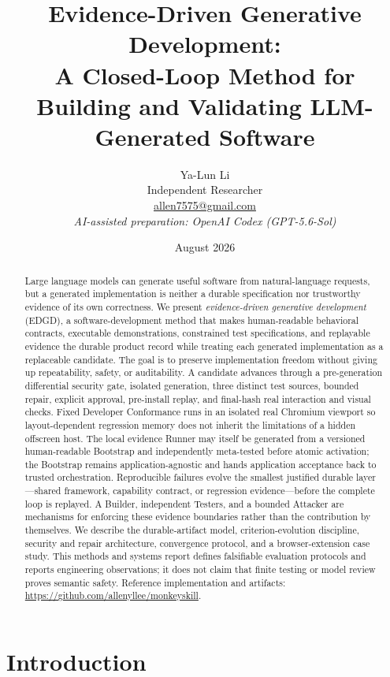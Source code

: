 \documentclass[10pt]{article}
\title{Evidence-Driven Generative Development:\\
A Closed-Loop Method for Building and Validating LLM-Generated Software}
\author{Ya-Lun Li\\
Independent Researcher\\
\href{mailto:allen7575@gmail.com}{allen7575@gmail.com}\\[0.6em]
\small\textit{AI-assisted preparation: OpenAI Codex (GPT-5.6-Sol)}}
\date{August 2026}
\newcommand{\method}{\textsc{EDGD}\xspace}
\begin{document}
\maketitle

\begin{abstract}
Large language models can generate useful software from natural-language requests, but a generated implementation is neither a durable specification nor trustworthy evidence of its own correctness. We present \emph{evidence-driven generative development} (\method), a software-development method that makes human-readable behavioral contracts, executable demonstrations, constrained test specifications, and replayable evidence the durable product record while treating each generated implementation as a replaceable candidate. The goal is to preserve implementation freedom without giving up repeatability, safety, or auditability. A candidate advances through a pre-generation differential security gate, isolated generation, three distinct test sources, bounded repair, explicit approval, pre-install replay, and final-hash real interaction and visual checks. Fixed Developer Conformance runs in an isolated real Chromium viewport so layout-dependent regression memory does not inherit the limitations of a hidden offscreen host. The local evidence Runner may itself be generated from a versioned human-readable Bootstrap and independently meta-tested before atomic activation; the Bootstrap remains application-agnostic and hands application acceptance back to trusted orchestration. Reproducible failures evolve the smallest justified durable layer---shared framework, capability contract, or regression evidence---before the complete loop is replayed. A Builder, independent Testers, and a bounded Attacker are mechanisms for enforcing these evidence boundaries rather than the contribution by themselves. We describe the durable-artifact model, criterion-evolution discipline, security and repair architecture, convergence protocol, and a browser-extension case study. This methods and systems report defines falsifiable evaluation protocols and reports engineering observations; it does not claim that finite testing or model review proves semantic safety. Reference implementation and artifacts: \url{https://github.com/allenyllee/monkeyskill}.
\end{abstract}

\section{Introduction}
\end{document}
